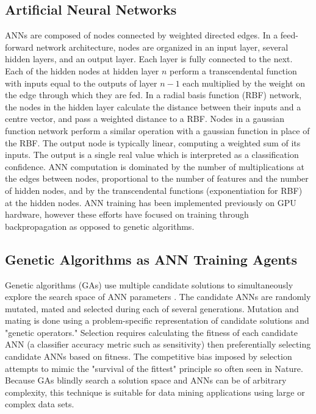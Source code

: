 \documentclass[11pt]{article}       %
\begin{document}
\subsection{Artificial Neural Networks} \label{ann}
ANNs are composed of nodes connected by weighted directed edges. In a feed-forward network architecture, nodes are organized in an input layer, several hidden layers, and an output layer. Each layer is fully connected to the next. Each of the hidden nodes at hidden layer $n$ perform a transcendental function with inputs equal to the outputs of layer $n-1$ each multiplied by the weight on the edge through which they are fed. In a radial basis function (RBF) network, the nodes in the hidden layer calculate the distance between their inputs and a centre vector, and pass a weighted distance to a RBF. Nodes in a gaussian function network perform a similar operation with a gaussian function in place of the RBF. The output node is typically linear, computing a weighted sum of its inputs. The output is a single real value which is interpreted as a classification confidence. ANN computation is dominated by the number of multiplications at the edges between nodes, proportional to the number of features and the number of hidden nodes, and by the transcendental functions (exponentiation for RBF) at the hidden nodes.  ANN training has been implemented previously on GPU hardware, however these efforts have focused on training through backpropagation \cite{backprop} as opposed to genetic algorithms.

\subsection{Genetic Algorithms as ANN Training Agents} \label{ga}
Genetic algorithms (GAs) use multiple candidate solutions to simultaneously explore the search space of ANN parameters \cite{GA-ANN}. The candidate ANNs are randomly mutated, mated and selected during each of several generations. Mutation and mating is done using a problem-specific representation of candidate solutions and "genetic operators." Selection requires calculating the fitness of each candidate ANN (a classifier accuracy metric such as sensitivity) then preferentially selecting candidate ANNs based on fitness. The competitive bias imposed by selection attempts to mimic the "survival of the fittest" principle so often seen in Nature.  Because GAs blindly search a solution space and ANNs can be of arbitrary complexity, this technique is suitable for data mining applications using large or complex data sets.
\end{document}
